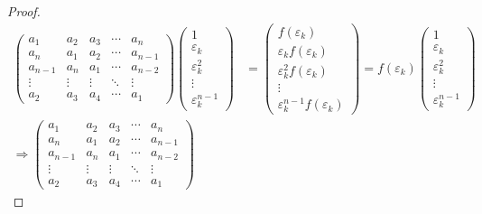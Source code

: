 \documentclass[class=linear-algebra,crop=false]{standalone}
\begin{document}
\begin{proof}
	\begingroup{}
	\allowdisplaybreaks{}
	\begin{align*}
		\begin{pmatrix}
			a_{1}   & a_{2}  & a_{3}  & \cdots & a_{n}   \\
			a_{n}   & a_{1}  & a_{2}  & \cdots & a_{n-1} \\
			a_{n-1} & a_{n}  & a_{1}  & \cdots & a_{n-2} \\
			\vdots  & \vdots & \vdots & \ddots & \vdots  \\
			a_{2}   & a_{3}  & a_{4}  & \cdots & a_{1}
		\end{pmatrix}
		\begin{pmatrix}
			1                   \\
			\varepsilon_{k}     \\
			\varepsilon_{k}^{2} \\
			\vdots              \\
			\varepsilon_{k}^{n-1}
		\end{pmatrix}
		 & =
		\begin{pmatrix}
			f(\varepsilon_{k})                    \\
			\varepsilon_{k}f(\varepsilon_{k})     \\
			\varepsilon_{k}^{2}f(\varepsilon_{k}) \\
			\vdots                                \\
			\varepsilon_{k}^{n-1}f(\varepsilon_{k})
		\end{pmatrix}
		= f(\varepsilon_{k})
		\begin{pmatrix}
			1                   \\
			\varepsilon_{k}     \\
			\varepsilon_{k}^{2} \\
			\vdots              \\
			\varepsilon_{k}^{n-1}
		\end{pmatrix}                   \\
		\Rightarrow
		\begin{pmatrix}
			a_{1}   & a_{2}  & a_{3}  & \cdots & a_{n}   \\
			a_{n}   & a_{1}  & a_{2}  & \cdots & a_{n-1} \\
			a_{n-1} & a_{n}  & a_{1}  & \cdots & a_{n-2} \\
			\vdots  & \vdots & \vdots & \ddots & \vdots  \\
			a_{2}   & a_{3}  & a_{4}  & \cdots & a_{1}
		\end{pmatrix}

\end{align*}
\end{proof}
\end{document}
